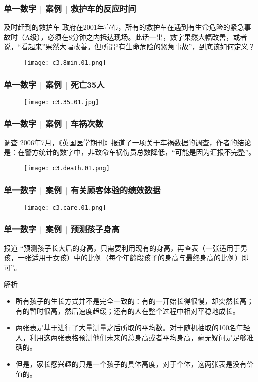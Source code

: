 \begin{frame}
  \frametitle{单一数字 | 案例 | 救护车的反应时间}
  \begin{block}{及时赶到的救护车}
政府在2001年宣布，所有的救护车在遇到有生命危险的紧急事故时（A级），必须在8分钟之内抵达现场。此话一出，数字果然大幅改善，或者说，“看起来”果然大幅改善。但所谓“有生命危险的紧急事故”，到底该如何定义？
  \end{block}
  \begin{figure}
    \centering
    \texttt{[image: c3.8min.01.png]}
  \end{figure}
\end{frame}

\begin{frame}
  \frametitle{单一数字 | 案例 | 死亡35人}
  \begin{figure}
    \centering
    \texttt{[image: c3.35.01.jpg]}
  \end{figure}
\end{frame}

\begin{frame}
  \frametitle{单一数字 | 案例 | 车祸次数}
  \begin{block}{调查}
    2006年7月，《英国医学期刊》报道了一项关于车祸数据的调查，作者的结论是：在警方统计的数字中，非致命车祸伤员总数降低，“可能是因为汇报不完整”。
  \end{block}
  \begin{figure}
    \centering
    \texttt{[image: c3.death.01.png]}
  \end{figure}
\end{frame}

\begin{frame}
  \frametitle{单一数字 | 案例 | 有关顾客体验的绩效数据}
  \begin{figure}
    \centering
    \texttt{[image: c3.care.01.png]}
  \end{figure}
\end{frame}

\begin{frame}
  \frametitle{单一数字 | 案例 | 预测孩子身高}
  \begin{block}{报道}
    “预测孩子长大后的身高，只需要利用现有的身高，再查表（一张适用于男孩，一张适用于女孩）中的比例（每个年龄段孩子的身高与最终身高的比例）即可”。
  \end{block}
  \pause \pause \pause \pause
  \begin{block}{解析}
    \begin{itemize}
      \item 所有孩子的生长方式并不是完全一致的：有的一开始长得很慢，却突然长高；有的暂时很高，然后速度趋缓；还有的人在整个过程中相对平稳地成长。
      \item 两张表是基于进行了大量测量之后所取的平均数。对于随机抽取的100名年轻人，利用这两张表格预测他们未来的总身高或者平均身高，毫无疑问是足够准确的。
      \item 但是，家长感兴趣的只是一个孩子的具体高度，对于个体，这两张表是没有价值的。
    \end{itemize}
  \end{block}
\end{frame}


